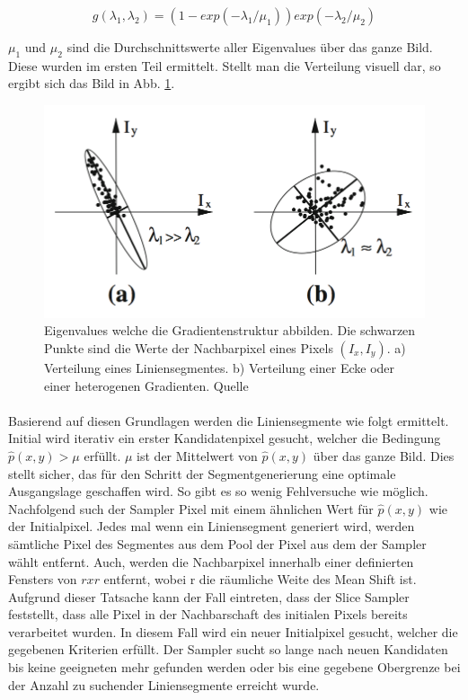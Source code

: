 \begin{equation}
g(\lambda_1, \lambda_2) = (1 - exp(-\lambda_1/\mu_1)) exp(-\lambda_2/\mu_2)
\end{equation}

$\mu_1$ und $\mu_2$ sind die Durchschnittswerte aller Eigenvalues über das ganze Bild. Diese wurden im ersten Teil ermittelt. Stellt man die Verteilung visuell dar, so ergibt sich das Bild in Abb. \ref{fig:lswms-eigenvalues}.

\begin{figure}[!ht]
\centering
\includegraphics[width=\textwidth]{images/lswms-eigenvalues} 
\caption{Eigenvalues welche die Gradientenstruktur abbilden. Die schwarzen Punkte sind die Werte der Nachbarpixel eines Pixels $(I_x, I_y)$. a) Verteilung eines Liniensegmentes. b) Verteilung einer Ecke oder einer heterogenen Gradienten. Quelle \cite{nieto}}
\label{fig:lswms-eigenvalues}
\end{figure}

\paragraph{}
Basierend auf diesen Grundlagen werden die Liniensegmente wie folgt ermittelt. Initial wird iterativ ein erster Kandidatenpixel gesucht, welcher die Bedingung $\hat{p}(x, y) > \mu$ erfüllt. $\mu$ ist der Mittelwert von $\hat{p}(x, y)$ über das ganze Bild. Dies stellt sicher, das für den Schritt der Segmentgenerierung eine optimale Ausgangslage geschaffen wird. So gibt es so wenig Fehlversuche wie möglich. Nachfolgend such der Sampler Pixel mit einem ähnlichen Wert für $\hat{p}(x, y)$ wie der Initialpixel. Jedes mal wenn ein Liniensegment generiert wird, werden sämtliche Pixel des Segmentes aus dem Pool der Pixel aus dem der Sampler wählt entfernt. Auch, werden die Nachbarpixel innerhalb einer definierten Fensters von $r x r$ entfernt, wobei r die räumliche Weite des Mean Shift ist. Aufgrund dieser Tatsache kann der Fall eintreten, dass der Slice Sampler feststellt, dass alle Pixel in der Nachbarschaft des initialen Pixels bereits verarbeitet wurden. In diesem Fall wird ein neuer Initialpixel gesucht, welcher die gegebenen Kriterien erfüllt. Der Sampler sucht so lange nach neuen Kandidaten bis keine geeigneten mehr gefunden werden oder bis eine gegebene Obergrenze bei der Anzahl zu suchender Liniensegmente erreicht wurde.
